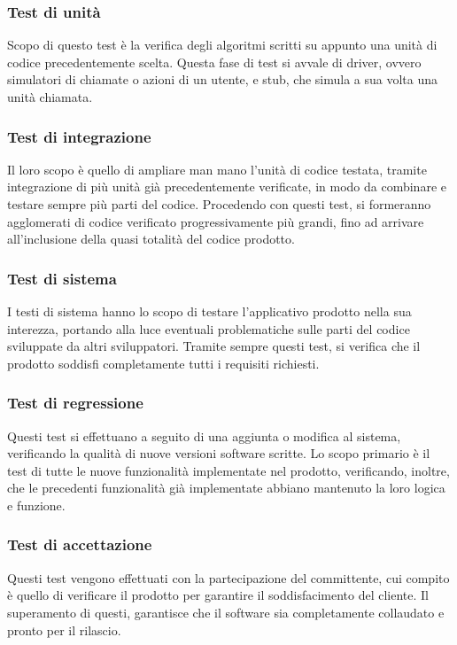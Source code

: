 \subsubsection{Test di unità}
Scopo di questo test è la verifica degli algoritmi scritti su appunto una unità di codice precedentemente scelta. Questa fase di test si avvale di driver, ovvero simulatori di chiamate o azioni di un utente, e stub, che simula a sua volta una unità chiamata.

\subsubsection{Test di integrazione}
Il loro scopo è quello di ampliare man mano l’unità di codice testata, tramite integrazione di più unità già precedentemente verificate, in modo da combinare e testare sempre più parti del codice. Procedendo con questi test, si formeranno agglomerati di codice verificato progressivamente più grandi, fino ad arrivare all’inclusione della quasi totalità del codice prodotto.

\subsubsection{Test di sistema}
I testi di sistema hanno lo scopo di testare l’applicativo prodotto nella sua interezza, portando alla luce eventuali problematiche sulle parti del codice sviluppate da altri sviluppatori. Tramite sempre questi test, si verifica che il prodotto soddisfi completamente tutti i requisiti richiesti.

\subsubsection{Test di regressione}
Questi test si effettuano a seguito di una aggiunta o modifica al sistema, verificando la qualità di nuove versioni software scritte. Lo scopo primario è il test di tutte le nuove funzionalità implementate nel prodotto, verificando, inoltre, che le precedenti funzionalità già implementate abbiano mantenuto la loro logica e funzione.

\subsubsection{Test di accettazione}
Questi test vengono effettuati con la partecipazione del committente, cui compito è quello di verificare il prodotto per garantire il soddisfacimento del cliente. Il superamento di questi, garantisce che il software sia completamente collaudato e pronto per il rilascio.

